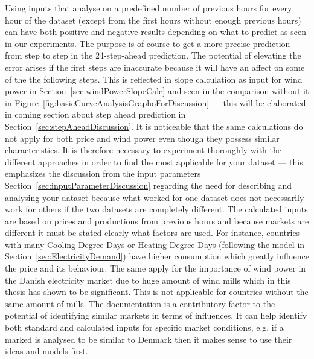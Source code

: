 Using inputs that analyse on a predefined number of previous hours for every hour of the dataset (except from the first hours without enough previous hours) can have both positive and negative results depending on what to predict as seen in our experiments. The purpose is of course to get a more precise prediction from step to step in the 24-step-ahead prediction. The potential of elevating the error arises if the first steps are inaccurate because it will have an affect on some of the the following steps. This is reflected in slope calculation as input for wind power in Section~\ref{sec:windPowerSlopeCalc} and seen in the comparison without it in Figure~\ref{fig:basicCurveAnalysisGraphoForDiscussion} --- this will be elaborated in coming section about step ahead prediction in Section~\ref{sec:stepAheadDiscussion}. It is noticeable that the same calculations do not apply for both price and wind power even though they possess similar characteristics. It is therefore necessary to experiment thoroughly with the different approaches in order to find the most applicable for your dataset --- this emphasizes the discussion from the input parameters Section~\ref{sec:inputParameterDiscussion} regarding the need for describing and analysing your dataset because what worked for one dataset does not necessarily work for others if the two datasets are completely different. The calculated inputs are based on prices and productions from previous hours and because markets are different it must be stated clearly what factors are used. For instance, countries with many Cooling Degree Days or Heating Degree Days (following the model in Section~\ref{sec:ElectricityDemand}) have higher consumption which greatly influence the price and its behaviour. The same apply for the importance of wind power in the Danish electricity market due to huge amount of wind mills which in this thesis has shown to be significant. This is not applicable for countries without the same amount of mills. The documentation is a contributory factor to the potential of identifying similar markets in terms of influences. It can help identify both standard and calculated inputs for specific market conditions, e.g. if a marked is analysed to be similar to Denmark then it makes sense to use their ideas and models first.


